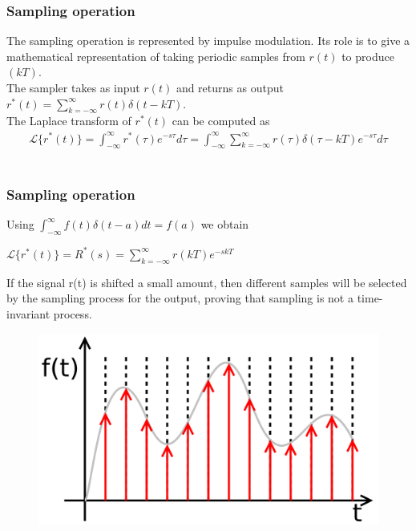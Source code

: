 \begin{frame}
	\frametitle{Sampling operation}
	\vspace{-4ex}
	The sampling operation is represented by impulse modulation. Its role is to give a mathematical representation of taking periodic samples from $r(t)$ to produce $(kT)$. \\
	\medskip
	The sampler takes as input $r(t)$ and returns as output
	\bigskip
	$r^*(t)=\sum_{k=-\infty}^{\infty} r(t)\delta(t-kT)$.\\
	The Laplace transform of $r^*(t)$ can be computed as\\
	\vspace{-2ex} 
	\begin{align*} 
	\mathcal{L}\{r^*(t)\} = \int_{-\infty}^{\infty} r^*(\tau)e^{-s\tau} d\tau = \int_{-\infty}^{\infty} \sum_{k=-\infty}^{\infty} r(\tau)\delta(\tau-kT)e^{-s\tau}d\tau 
	\end{align*}\\
\end{frame}

\begin{frame}
	\frametitle{Sampling operation}
	Using $\int_{-\infty}^{\infty} f(t)\delta(t-a)dt = f(a)$ we obtain \\ 
	\begin{center}
		$\mathcal{L}\{r^*(t)\} = R^*(s) = \sum_{k=-\infty}^{\infty} r(kT)e^{-skT}$
	\end{center}
	If the signal r(t) is shifted a small amount, then different samples will be selected by the sampling process for the output, proving that sampling is not a time-invariant process.
	\begin{figure}
		\includegraphics[width=0.6\linewidth]{sampled_signal}
	\end{figure}
\end{frame}

